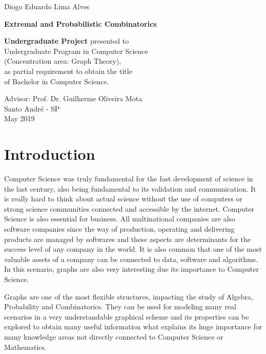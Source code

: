 \documentclass[12pt,twoside,a4paper,bibliography=totocnumbered]{book}
\numberwithin{equation}{section}
\theoremstyle{remark}
\begin{document}
\newpage
\begin{center}
Diogo Eduardo Lima Alves
\end{center}
   \begin{center}
        \vspace*{4 cm}
        \textbf{\Large{Extremal and Probabilistic Combinatorics}}\\
        \vspace*{5cm}
    \end{center}

    \begin{flushright}
{\bf Undergraduate Project} presented to\\ 
Undergraduate Program in Computer Science\\ 
(Concentration area: Graph Theory),\\ 
as partial requirement to obtain the title\\ 
of Bachelor in Computer Science.
    \end{flushright}

\vspace{3cm}
\begin{center}
Advisor: Prof. Dr. Guilherme Oliveira Mota\\
\vfill
Santo André - SP\\
May 2019
\end{center}

\tableofcontents

\listoffigures

\chapter{Introduction}
Computer Science was truly fundamental for the fast development of science in the last century, also being fundamental to its validation and communication. It is really hard to think about actual science without the use of computers or strong science communities connected and accessible by the internet. Computer Science is also essential for business. All multinational companies are also software companies since the way of production, operating and delivering products are managed by softwares and these aspects are determinants for the success level of any company in the world. It is also common that one of the most valuable assets of a company can be connected to data, software and algorithms. In this scenario, graphs are also very interesting due its importance to Computer Science.

Graphs are one of the most flexible structures, impacting the study of Algebra, Probability and Combinatorics. They can be used for modeling many real scenarios in a very understandable graphical scheme and its properties can be explored to obtain many useful information what explains its huge importance for many knowledge areas not directly connected to Computer Science or Mathematics.   
\end{document}
